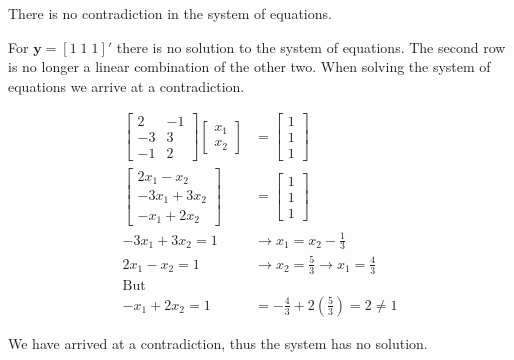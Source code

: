 There is no contradiction in the system of equations.



For $\mathbf{y} = [1 \; 1 \; 1]'$ there is no solution to the system of
equations.
The second row is no longer a linear
combination of the other two.
When solving the system
of equations we arrive at a contradiction.


\begin{align*}
  \begin{bmatrix}
    2 & -1\\ -3 & 3\\-1 & 2
  \end{bmatrix}
  \begin{bmatrix}
   x_1 \\x_2
  \end{bmatrix}
    & =
    \begin{bmatrix}1\\  1\\  1\end{bmatrix}\\
    \begin{bmatrix}
    2 x_1 - x_2\\ -3 x_1 + 3 x_2\\-x_1 + 2 x_2
  \end{bmatrix} &= \begin{bmatrix}1\\  1\\  1\end{bmatrix}\\
  -3 x_1 + 3 x_2 = 1 & \rightarrow x_1 = x_2 -\frac{1}{3}\\
  2 x_1 - x_2 = 1 & \rightarrow x_2 = \frac{5}{3} \rightarrow x_1 = \frac{4}{3}\\
  \text{But} & \\
  - x_1 + 2 x_2 = 1 & = - \frac{4}{3} + 2 (\frac{5}{3}) = 2 \neq 1
\end{align*}

We have arrived at a contradiction, thus the system has no solution.
